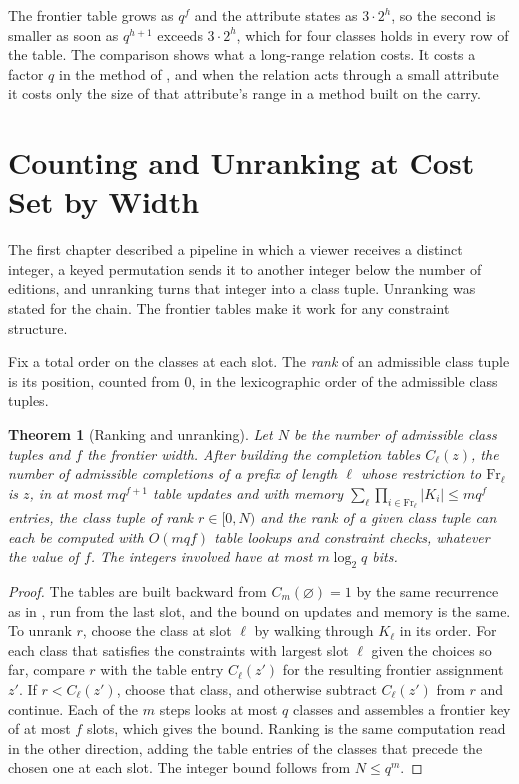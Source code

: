 \documentclass[11pt,twoside,openright]{book}
\theoremstyle{plain}
\newtheorem{theorem}{Theorem}[chapter]
\theoremstyle{definition}
\theoremstyle{remark}
\newcommand{\Fr}{\mathrm{Fr}}
\begin{document}
The frontier table grows as $q^{f}$ and the attribute states as $3\cdot2^{h}$, so the second is smaller as soon as $q^{h+1}$ exceeds $3\cdot2^h$, which for four classes holds in every row of the table. The comparison shows what a long-range relation costs. It costs a factor $q$ in the method of , and when the relation acts through a small attribute it costs only the size of that attribute's range in a method built on the carry.

\section{Counting and Unranking at Cost Set by Width}\label{sec:unrank}

The first chapter described a pipeline in which a viewer receives a distinct integer, a keyed permutation sends it to another integer below the number of editions, and unranking turns that integer into a class tuple. Unranking was stated for the chain. The frontier tables make it work for any constraint structure.

Fix a total order on the classes at each slot. The \emph{rank} of an admissible class tuple is its position, counted from $0$, in the lexicographic order of the admissible class tuples.

\begin{theorem}[Ranking and unranking]\label{thm:rank}
Let $N$ be the number of admissible class tuples and $f$ the frontier width. After building the completion tables $C_\ell(z)$, the number of admissible completions of a prefix of length $\ell$ whose restriction to $\Fr_\ell$ is $z$, in at most $mq^{f+1}$ table updates and with memory $\sum_\ell\prod_{i\in\Fr_\ell}\lvert K_i\rvert\le mq^f$ entries, the class tuple of rank $r\in[0,N)$ and the rank of a given class tuple can each be computed with $O(mqf)$ table lookups and constraint checks, whatever the value of $f$. The integers involved have at most $m\log_2q$ bits.
\end{theorem}

\begin{proof}
The tables are built backward from $C_m(\varnothing)=1$ by the same recurrence as in , run from the last slot, and the bound on updates and memory is the same. To unrank $r$, choose the class at slot $\ell$ by walking through $K_\ell$ in its order. For each class that satisfies the constraints with largest slot $\ell$ given the choices so far, compare $r$ with the table entry $C_\ell(z')$ for the resulting frontier assignment $z'$. If $r<C_\ell(z')$, choose that class, and otherwise subtract $C_\ell(z')$ from $r$ and continue. Each of the $m$ steps looks at most $q$ classes and assembles a frontier key of at most $f$ slots, which gives the bound. Ranking is the same computation read in the other direction, adding the table entries of the classes that precede the chosen one at each slot. The integer bound follows from $N\le q^m$.
\end{proof}
\end{document}

